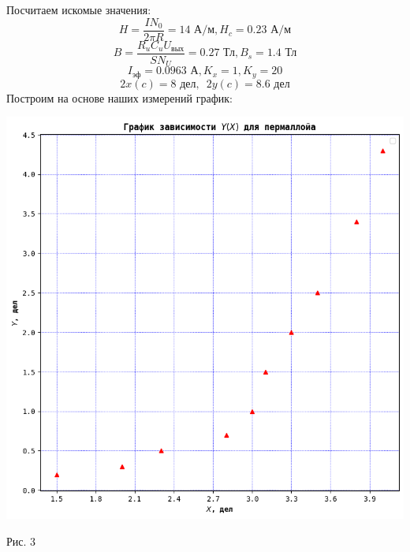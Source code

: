 \documentclass[a4paper, 12pt]{article}
\begin{document}
Посчитаем искомые значения:
$$H = \frac{I N_0}{2 \pi R} = 14 \text{ А/м}, H_c = 0.23\text{ А/м}$$
$$B = \frac{R_u C_u U_\text{вых}}{S N_U} = 0.27 \text{ Тл}, B_s = 1.4\text{ Тл}$$
$$I_\text{эф} = 0.0963 \text{ А}, K_x = 1, K_y = 20$$
$$2x(c) = 8 \text{ дел}, \phantom 22y(c) = 8.6 \text{ дел}$$Построим на основе наших измерений график: 
\begin{center}
    \centering
    \includegraphics[width=0.5\linewidth]{Permalloy_graphic.png}
    \caption{Рис. 3}
    \label{fig:enter-label}
\end{center}
\end{document}
